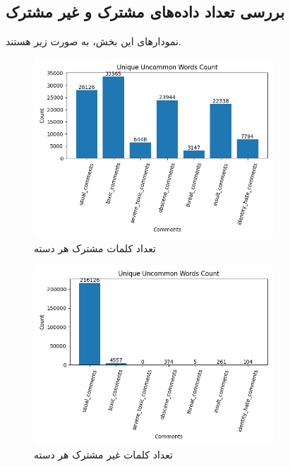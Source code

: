 \subsection{بررسی تعداد داده‌های مشترک و غیر مشترک} 
\par
نمودارهای این بخش، به صورت زیر هستند.\\

\begin{figure}
  \centering
  \includegraphics[width=0.8\textwidth]{stats/unique_common_words_total.png}
  \caption{تعداد کلمات مشترک هر دسته}
  \label{fig:unique_common_words_total}
\end{figure}

\begin{figure}
  \centering
  \includegraphics[width=0.8\textwidth]{stats/unique_uncommon_words_count.png}
  \caption{تعداد کلمات غیر مشترک هر دسته}
  \label{fig:unique_uncommon_words_count}
\end{figure}

\clearpage

